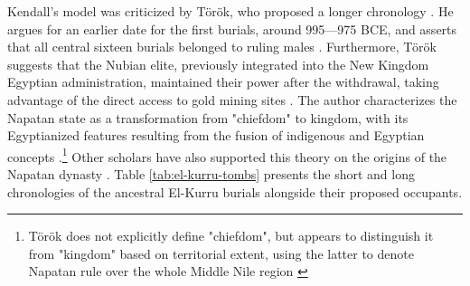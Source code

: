 Kendall's model was criticized by Török, who proposed a longer chronology \parencite[p.~298-309]{törökEmergenceKingdomKush1995, törökOriginNapatanState1999, törökTwoWorldsFrontier2009}. He argues for an earlier date for the first burials, around 995---975 BCE, and asserts that all central sixteen burials belonged to ruling males \parencite[p.~301]{törökTwoWorldsFrontier2009}. Furthermore, Török suggests that the Nubian elite, previously integrated into the New Kingdom Egyptian administration, maintained their power after the withdrawal, taking advantage of the direct access to gold mining sites \parencite[p.~111-112]{törökKingdomKushHandbook1997}. The author characterizes the Napatan state as a transformation from "chiefdom" to kingdom, with its Egyptianized features resulting from the fusion of indigenous and Egyptian concepts \parencites{törökKingdomKushHandbook1997, törökTwoWorldsFrontier2009}.\footnote{Török does not explicitly define "chiefdom", but appears to distinguish it from "kingdom" based on territorial extent, using the latter to denote Napatan rule over the whole Middle Nile region \parencite[p.~193]{törökKingdomKushHandbook1997}} Other scholars have also supported this theory on the origins of the Napatan dynasty \parencites{morkotFoundationsKushiteState1995, morkotEgyptNubiaEgyptian2001}{yellinEgyptianReligionIts1995}{smithNubiaEgyptInteraction1998}{binder10th9thCenturyBC2011}. Table \ref{tab:el-kurru-tombs} presents the short and long chronologies of the ancestral El-Kurru burials alongside their proposed occupants.



